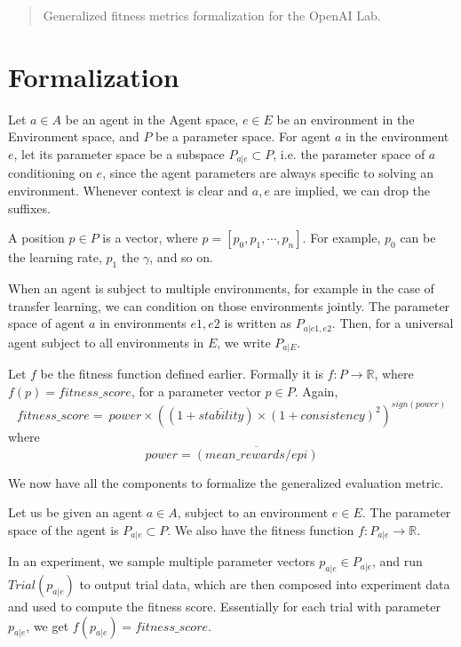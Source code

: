 \documentclass[12pt]{article}
\begin{document}
\maketitle

\begin{abstract}
Generalized fitness metrics formalization for the OpenAI Lab.
\end{abstract}

\section{Formalization}

Let $a \in A$ be an agent in the Agent space, $e \in E$ be an environment in the Environment space, and $P$ be a parameter space. For agent $a$ in the environment $e$, let its parameter space be a subspace $P_{a|e} \subset P$, i.e. the parameter space of $a$ conditioning on $e$, since the agent parameters are always specific to solving an environment. Whenever context is clear and $a, e$ are implied, we can drop the suffixes.

A position $p \in P$ is a vector, where $p = [ p_0, p_1, \cdots , p_n ]$. For example, $p_0$ can be the learning rate, $p_1$ the $\gamma$, and so on.

When an agent is subject to multiple environments, for example in the case of transfer learning, we can condition on those environments jointly. The parameter space of agent $a$ in environments $e1, e2$ is written as $P_{a|e1,e2}$. Then, for a universal agent subject to all environments in $E$, we write $P_{a|E}$.

Let $f$ be the fitness function defined earlier. Formally it is $f: P \longrightarrow \mathbb{R}$, where $f(p) = fitness\_score$, for a parameter vector $p \in P$. Again,
$$fitness\_score = \ power \times ((1+\overline{stability}) \times (1+consistency)^2)^{sign(power)}$$
where $$power = \overline{(mean\_rewards/epi)}$$

We now have all the components to formalize the generalized evaluation metric.

Let us be given an agent $a \in A$, subject to an environment $e \in E$. The parameter space of the agent is $P_{a|e} \subset P$. We also have the fitness function $f: P_{a|e} \longrightarrow \mathbb{R}$.

In an experiment, we sample multiple parameter vectors $p_{a|e} \in P_{a|e}$, and run $Trial(p_{a|e})$ to output trial data, which are then composed into experiment data and used to compute the fitness score. Essentially for each trial with parameter $p_{a|e}$, we get $f(p_{a|e}) = fitness\_score$.
\end{document}
